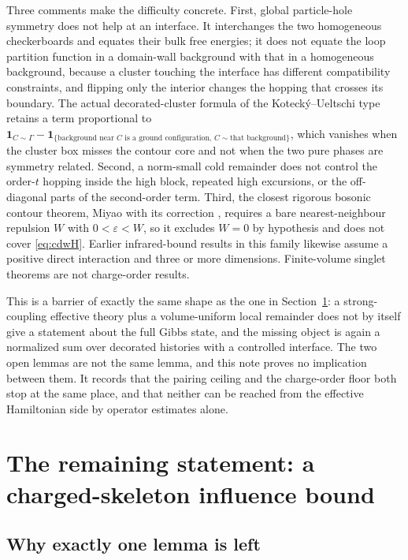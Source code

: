 \documentclass[11pt]{article}
\theoremstyle{definition}
\theoremstyle{remark}
\begin{document}
Three comments make the difficulty concrete. First, global particle-hole symmetry
does not help at an interface. It interchanges the two homogeneous checkerboards
and equates their bulk free energies; it does not equate the loop partition
function in a domain-wall background with that in a homogeneous background,
because a cluster touching the interface has different compatibility constraints,
and flipping only the interior changes the hopping that crosses its boundary. The
actual decorated-cluster formula of the Koteck\'y--Ueltschi type \cite{ku99}
retains a term
proportional to $\mathbf{1}_{C\sim\Gamma}-\mathbf{1}_{\{\text{background near }C
\text{ is a ground configuration},\,C\sim\text{that background}\}}$, which
vanishes when the cluster box misses the contour core and not when the two pure
phases are symmetry related. Second, a norm-small cold remainder does not control
the order-$t$ hopping inside the high block, repeated high excursions, or the
off-diagonal parts of the second-order term. Third, the closest rigorous bosonic
contour theorem, Miyao \cite{miyao24} with its correction \cite{miyao24corr},
requires a bare nearest-neighbour repulsion $W$ with $0<\varepsilon<W$, so it
excludes $W=0$ by hypothesis and does not cover \eqref{eq:cdwH}. Earlier
infrared-bound results in this family likewise assume a positive direct
interaction and three or more dimensions. Finite-volume singlet theorems are not
charge-order results.

This is a barrier of exactly the same shape as the one in
Section~\ref{sec:openproblem}: a strong-coupling effective theory plus a
volume-uniform local remainder does not by itself give a statement about the full
Gibbs state, and the missing object is again a normalized sum over decorated
histories with a controlled interface. The two open lemmas are not the same lemma,
and this note proves no implication between them. It records that the pairing
ceiling and the charge-order floor both stop at the same place, and that neither
can be reached from the effective Hamiltonian side by operator estimates alone.

\section{The remaining statement: a charged-skeleton influence bound}
\label{sec:openproblem}

\subsection{Why exactly one lemma is left}
\end{document}
